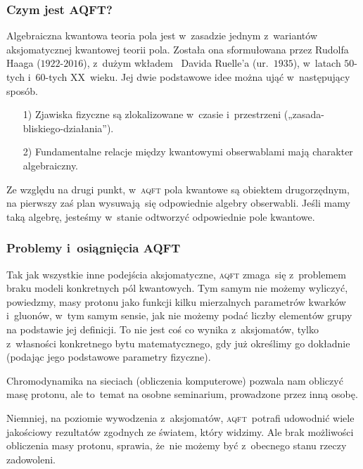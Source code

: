 \documentclass[10pt,t]{beamer}
\begin{document}
\begin{frame}
  \frametitle{Czym jest AQFT?}


  Algebraiczna kwantowa teoria pola jest w~zasadzie jednym z~wariantów
  aksjomatycznej kwantowej teorii pola. Została ona sformułowana przez
  Rudolfa Haaga ($1922\text{-}2016$), z~dużym wkładem ~Davida Ruelle’a
  (ur.~$1935$), w~latach $50$-tych i~$60$-tych XX~wieku. Jej dwie podstawowe
  idee można ująć w~następujący sposób.
  \begin{itemize}

  \item[1)] Zjawiska fizyczne są zlokalizowane w~czasie i~przestrzeni
    („zasada-bliskiego-działania”).

  \item[2)] Fundamentalne relacje między kwantowymi obserwablami mają
    charakter algebraiczny.

  \end{itemize}

  Ze względu na drugi punkt, w~\textsc{aqft} pola kwantowe są obiektem
  drugorzędnym, na pierwszy zaś plan wysuwają~się odpowiednie algebry
  obserwabli. Jeśli mamy taką algebrę, jesteśmy w~stanie odtworzyć
  odpowiednie pole kwantowe.

\end{frame}





\begin{frame}
  \frametitle{Problemy i~osiągnięcia AQFT}


  Tak jak wszystkie inne podejścia aksjomatyczne, \textsc{aqft} zmaga~się
  z~problemem braku modeli konkretnych pól kwantowych. Tym samym nie możemy
  wyliczyć, powiedzmy, masy protonu jako funkcji kilku mierzalnych
  parametrów kwarków i~gluonów, w~tym samym sensie, jak nie możemy podać
  liczby elementów grupy na podstawie jej definicji. To nie jest coś co
  wynika z~aksjomatów, tylko z~własności konkretnego bytu matematycznego,
  gdy już określimy go dokładnie (podając jego podstawowe parametry
  fizyczne).

  Chromodynamika na sieciach (obliczenia komputerowe) pozwala nam obliczyć
  masę protonu, ale to~temat na osobne seminarium, prowadzone przez inną
  osobę.

  Niemniej, na poziomie wywodzenia z~aksjomatów, \textsc{aqft}~potrafi
  udowodnić wiele jakościowy rezultatów zgodnych ze światem, który widzimy.
  Ale brak możliwości obliczenia masy protonu, sprawia, że~nie możemy być
  z~obecnego stanu rzeczy zadowoleni.

\end{frame}
\end{document}
